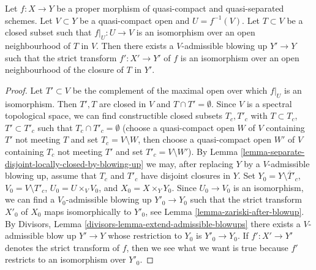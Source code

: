 \begin{lemma}
\label{lemma-blowup-iso-along}
Let $f : X \to Y$ be a proper morphism of quasi-compact and
quasi-separated schemes. Let $V \subset Y$ be a quasi-compact open
and $U = f^{-1}(V)$. Let $T \subset V$ be a closed subset such that
$f|_U : U \to V$ is an isomorphism over an open neighbourhood of $T$
in $V$. Then there exists a $V$-admissible blowing up $Y' \to Y$
such that the strict transform $f' : X' \to Y'$ of $f$
is an isomorphism over an open neighbourhood of the closure
of $T$ in $Y'$.
\end{lemma}

\begin{proof}
Let $T' \subset V$ be the complement of the maximal open over which
$f|_U$ is an isomorphism. Then $T', T$ are closed in $V$ and
$T \cap T' = \emptyset$. Since $V$ is a spectral topological
space, we can find constructible closed subsets $T_c, T'_c$
with $T \subset T_c$, $T' \subset T'_c$ such that
$T_c \cap T'_c = \emptyset$ (choose a quasi-compact
open $W$ of $V$ containing $T'$ not meeting $T$
and set $T_c = V \setminus W$, then choose a quasi-compact
open $W'$ of $V$ containing $T_c$ not meeting $T'$
and set $T'_c = V \setminus W'$).
By Lemma \ref{lemma-separate-disjoint-locally-closed-by-blowing-up}
we may, after replacing $Y$ by a $V$-admissible blowing up,
assume that $T_c$ and $T'_c$ have disjoint closures in $Y$.
Set $Y_0 = Y \setminus \overline{T}'_c$, $V_0 = V \setminus T'_c$,
$U_0 = U \times_V V_0$, and $X_0 = X \times_Y Y_0$.
Since $U_0 \to V_0$ is an isomorphism, we can find a
$V_0$-admissible blowing up $Y'_0 \to Y_0$ such that the
strict transform $X'_0$ of $X_0$ maps isomorphically to $Y'_0$, see
Lemma \ref{lemma-zariski-after-blowup}.
By Divisors, Lemma \ref{divisors-lemma-extend-admissible-blowups}
there exists a $V$-admissible blow up $Y' \to Y$ whose restriction
to $Y_0$ is $Y'_0 \to Y_0$. If $f' : X' \to Y'$ denotes the
strict transform of $f$, then we see what we want is true because
$f'$ restricts to an isomorphism over $Y'_0$.
\end{proof}
